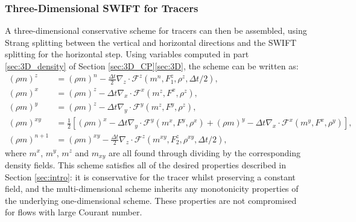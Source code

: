 \documentclass{ametsocV6.1}
\begin{document}
\subsubsection{Three-Dimensional SWIFT for Tracers}
A three-dimensional conservative scheme for tracers can then be assembled, using Strang splitting between the vertical and horizontal directions and the SWIFT splitting for the horizontal step.
Using variables computed in part \ref{sec:3D_density} of Section \ref{sec:3D_CP}\ref{sec:3D}, the scheme can be written as:
\begin{subequations}
\begin{align}
(\rho m)^z & = (\rho m)^n - \tfrac{\Delta t}{2}\nabla_z \cdot \mathcal{F}^z\left(m^n, F^z_1, \rho^z, \Delta t /2 \right), \\
(\rho m)^x & = (\rho m)^z - \Delta t \nabla_x \cdot \mathcal{F}^x\left(m^z, F^x, \rho^z \right), \\
(\rho m)^y & = (\rho m)^z - \Delta t \nabla_y \cdot \mathcal{F}^y\left(m^z, F^y, \rho^z \right), \\
(\rho m)^{xy} & = \frac{1}{2}\left[(\rho m)^x - \Delta t \nabla_y \cdot \mathcal{F}^y\left(m^x, F^y, \rho^x \right) + (\rho m)^y - \Delta t \nabla_x \cdot \mathcal{F}^x\left(m^y, F^x,\rho^y\right)\right], \\
(\rho m)^{n+1} & = (\rho m)^{xy} - \tfrac{\Delta t}{2}\nabla_z\cdot\mathcal{F}^z\left(m^{xy},F_2^z,\rho^{xy},\Delta t/2\right),
\end{align}
\end{subequations}
where $m^x$, $m^y$, $m^z$ and $m_{xy}$ are all found through dividing by the corresponding density fields.
This scheme satisfies all of the desired properties described in Section \ref{sec:intro}: it is conservative for the tracer whilst preserving a constant field, and the multi-dimensional scheme inherits any monotonicity properties of the underlying one-dimensional scheme.
These properties are not compromised for flows with large Courant number.
\end{document}
